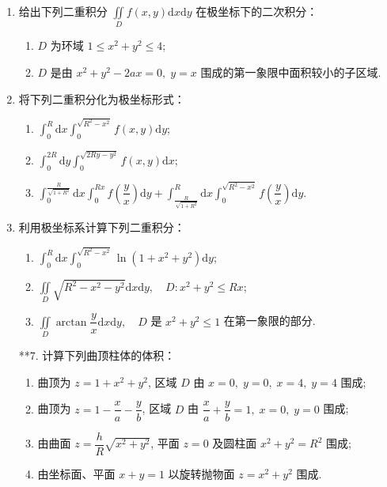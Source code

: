 \begin{enumerate}
    \item 给出下列二重积分 $\displaystyle\iint\limits_{D}f(x, y)\text{d}x\text{d}y$ 在极坐标下的二次积分：
    \begin{enumerate}[(1)]\setlength{\itemsep}{5pt}\setlength{\topsep}{15pt}
        \item $D$ 为环域 $1\leqslant x^2+y^2\leqslant 4$;
        \item $D$ 是由 $x^2+y^2-2ax=0,\;y=x$ 围成的第一象限中面积较小的子区域.
    \end{enumerate}

    \item 将下列二重积分化为极坐标形式：
    \begin{enumerate}[(1)]\setlength{\itemsep}{5pt}\setlength{\topsep}{15pt}
        \item $\displaystyle\int_{0}^{R}\text{d}x\int_{0}^{\sqrt{R^2-x^2}}f(x, y)\text{d}y$;
        \item $\displaystyle\int_{0}^{2R}\text{d}y\int_{0}^{\sqrt{2Ry-y^2}}f(x, y)\text{d}x$;
        \item $\displaystyle\int_{0}^{\frac{R}{\sqrt{1+R^2}}}\text{d}x\int_{0}^{Rx}f\left(\dfrac{y}{x}\right)\text{d}y+\int_{\frac{R}{\sqrt{1+R^2}}}^{R}\text{d}x\int_0^{\sqrt{R^2-x^2}}f\left(\dfrac{y}{x}\right)\text{d}y$.
    \end{enumerate}

    \item 利用极坐标系计算下列二重积分：
    \begin{enumerate}[(1)]\setlength{\itemsep}{5pt}\setlength{\topsep}{15pt}
        \item $\displaystyle\int_{0}^{R}\text{d}x\int_{0}^{\sqrt{R^2-x^2}}\ln(1+x^2+y^2)\text{d}y$;
        \item $\displaystyle\iint\limits_{D}\sqrt{R^2-x^2-y^2}\text{d}x\text{d}y,\quad D : x^2+y^2\leqslant Rx$;
        \item $\displaystyle\iint\limits_{D}\arctan\dfrac{y}{x}\text{d}x\text{d}y,\quad D$ 是 $x^2+y^2\leqslant 1$ 在第一象限的部分.
    \end{enumerate}

    \item[**7.] 计算下列曲顶柱体的体积：
    \begin{enumerate}[(1)]\setlength{\itemsep}{5pt}\setlength{\topsep}{15pt}
        \item 曲顶为 $z=1+x^2+y^2$, 区域 $D$ 由 $x=0,\;y=0,\;x=4,\;y=4$ 围成;
        \item 曲顶为 $z=1-\dfrac{x}{a}-\dfrac{y}{b}$, 区域 $D$ 由 $\dfrac{x}{a}+\dfrac{y}{b}=1,\;x=0,\;y=0$ 围成;
        \item 由曲面 $z=\dfrac{h}{R}\sqrt{x^2+y^2}$, 平面 $z=0$ 及圆柱面 $x^2+y^2=R^2$ 围成;
        \item 由坐标面、平面 $x+y=1$ 以旋转抛物面 $z=x^2+y^2$ 围成.    
    \end{enumerate} 


\end{enumerate}
